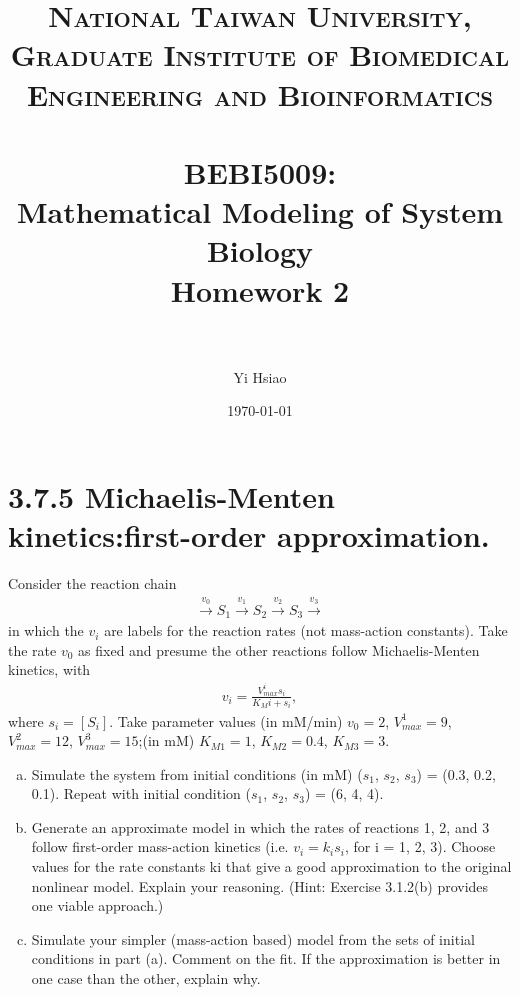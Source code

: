 \documentclass[paper=a4, fontsize=11pt]{scrartcl} %
\title{	
\normalfont \normalsize 
\textsc{National Taiwan University, \\ Graduate Institute of Biomedical Engineering and Bioinformatics} \\ [25pt] %
\horrule{0.5pt} \\[0.4cm] %
\huge BEBI5009:\\Mathematical Modeling of System Biology \\ Homework 2 \\ %
\horrule{2pt} \\[0.5cm] %
}
\author{Yi Hsiao} %
\date{\normalsize\today} %
\numberwithin{equation}{section} %
\numberwithin{figure}{section} %
\numberwithin{table}{section} %
\begin{document}
\maketitle %

\newpage
\section{3.7.5 Michaelis-Menten kinetics:first-order approximation.}
	Consider the reaction chain
	\begin{gather*}
		\xrightarrow{v_0} S_1 \xrightarrow{v_1} S_2 \xrightarrow{v_2} S_3 \xrightarrow{v_3} 
	\end{gather*}
	in which the $v_i$ are labels for the reaction rates (not mass-action constants). Take the rate $v_0$ as fixed and presume the other reactions follow Michaelis-Menten kinetics, with
	\begin{gather*}
		v_i=\frac{V^i_{max}s_i}{K_Mi+s_i},
	\end{gather*}
	where $s_i=[S_i]$. Take parameter values (in mM/min) $v_0=2$, $V^1_{max} = 9$, $V^2_{max}=12$, $V^3_{max}=15$;(in mM) $K_{M1} = 1$, $K_{M2} = 0.4$, $K_{M3} = 3$.
	\begin{enumerate}[a)]
		\item Simulate the system from initial conditions (in mM) ($s_1$, $s_2$, $s_3$) = (0.3, 0.2, 0.1). Repeat with initial condition ($s_1$, $s_2$, $s_3$) = (6, 4, 4).


		\item Generate an approximate model in which the rates of reactions 1, 2, and 3 follow first-order mass-action kinetics (i.e. $v_i = k_is_i$, for i = 1, 2, 3). Choose values for the rate constants ki that give a good approximation to the original nonlinear model. Explain your reasoning. (Hint: Exercise 3.1.2(b) provides one viable approach.)


		\item Simulate your simpler (mass-action based) model from the sets of initial conditions in part (a). Comment on the fit. If the approximation is better in one case than the other, explain why.


	\end{enumerate}
\end{document}
